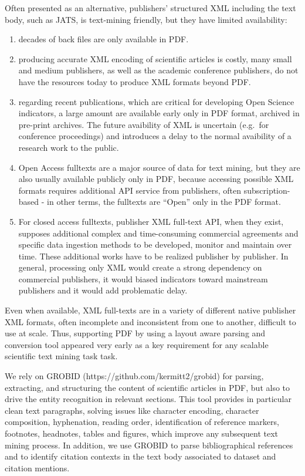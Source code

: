 \documentclass[
]{article}
\begin{document}
Often presented as an alternative, publishers' structured XML including
the text body, such as JATS, is text-mining friendly, but they have
limited availability:

\begin{enumerate}
\def\labelenumi{(\roman{enumi})}
\item
  decades of back files are only available in PDF.
\item
  producing accurate XML encoding of scientific articles is costly, many
  small and medium publishers, as well as the academic conference
  publishers, do not have the resources today to produce XML formats
  beyond PDF.
\item
  regarding recent publications, which are critical for developing Open
  Science indicators, a large amount are available early only in PDF
  format, archived in pre-print archives. The future avaibility of XML
  is uncertain (e.g.~for conference proceedings) and introduces a delay
  to the normal avaibility of a research work to the public.
\item
  Open Access fulltexts are a major source of data for text mining, but
  they are also usually available publicly only in PDF, because
  accessing possible XML formats requires additional API service from
  publishers, often subscription-based - in other terms, the fulltexts
  are ``Open'' only in the PDF format.
\item
  For closed access fulltexts, publisher XML full-text API, when they
  exist, supposes additional complex and time-consuming commercial
  agreements and specific data ingestion methods to be developed,
  monitor and maintain over time. These additional works have to be
  realized publisher by publisher. In general, processing only XML would
  create a strong dependency on commercial publishers, it would biased
  indicators toward mainstream publishers and it would add problematic
  delay.
\end{enumerate}

Even when available, XML full-texts are in a variety of different native
publisher XML formats, often incomplete and inconsistent from one to
another, difficult to use at scale. Thus, supporting PDF by using a
layout aware parsing and conversion tool appeared very early as a key
requirement for any scalable scientific text mining task task.

We rely on GROBID (https://github.com/kermitt2/grobid) for parsing,
extracting, and structuring the content of scientific articles in PDF,
but also to drive the entity recognition in relevant sections. This tool
provides in particular clean text paragraphs, solving issues like
character encoding, character composition, hyphenation, reading order,
identification of reference markers, footnotes, headnotes, tables and
figures, which improve any subsequent text mining process. In addition,
we use GROBID to parse bibliographical references and to identify
citation contexts in the text body associated to dataset and citation
mentions.
\end{document}
